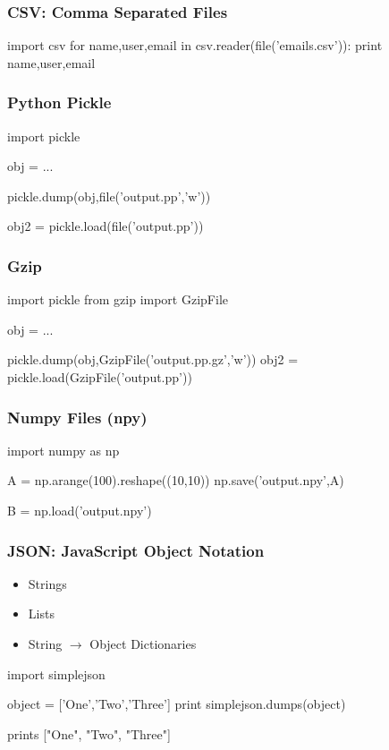 \begin{frame}[fragile]
\frametitle{CSV: Comma Separated Files} 

\begin{python}
import csv
for name,user,email in csv.reader(file('emails.csv')):
    print name,user,email
\end{python}

\end{frame}

\begin{frame}[fragile]
\frametitle{Python Pickle}

\begin{python}
import pickle

obj = ...

pickle.dump(obj,file('output.pp','w'))

obj2 = pickle.load(file('output.pp'))
\end{python}
\end{frame}

\begin{frame}[fragile]
\frametitle{Gzip}

\begin{python}
import pickle
from gzip import GzipFile

obj = ...

pickle.dump(obj,GzipFile('output.pp.gz','w'))
obj2 = pickle.load(GzipFile('output.pp'))
\end{python}
\end{frame}

\begin{frame}[fragile]
\frametitle{Numpy Files (npy)}

\begin{python}
import numpy as np

A = np.arange(100).reshape((10,10))
np.save('output.npy',A)

B = np.load('output.npy')
\end{python}
\end{frame}

\begin{frame}[fragile]
\frametitle{JSON: JavaScript Object Notation}

\begin{itemize}
\item Strings
\item Lists
\item String $\to$ Object Dictionaries
\end{itemize}

\begin{python}
import simplejson

object = ['One','Two','Three']
print simplejson.dumps(object)
\end{python}
prints ["One", "Two", "Three"]

\end{frame}


